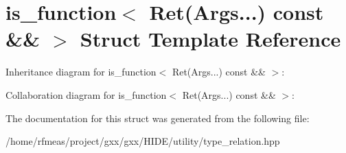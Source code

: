 \hypertarget{structis__function_3_01Ret_07Args_8_8_8_08_01const_01_6_6_01_4}{}\section{is\+\_\+function$<$ Ret(Args...) const \&\& $>$ Struct Template Reference}
\label{structis__function_3_01Ret_07Args_8_8_8_08_01const_01_6_6_01_4}


Inheritance diagram for is\+\_\+function$<$ Ret(Args...) const \&\& $>$\+:


Collaboration diagram for is\+\_\+function$<$ Ret(Args...) const \&\& $>$\+:


The documentation for this struct was generated from the following file\+:\begin{DoxyCompactItemize}
\item 
/home/rfmeas/project/gxx/gxx/\+H\+I\+D\+E/utility/type\+\_\+relation.\+hpp\end{DoxyCompactItemize}
